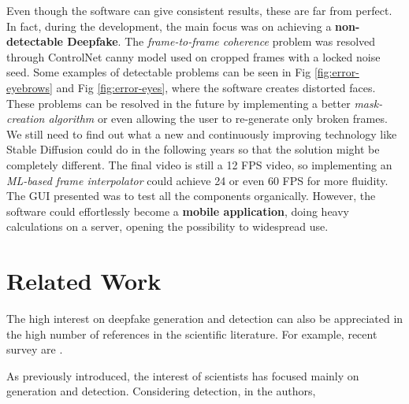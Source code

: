 \documentclass[preprint]{elsarticle}
\begin{document}
Even though the software can give consistent results, these are far from perfect. 
In fact, during the development, the main focus was on achieving a \textbf{non-detectable Deepfake}. 
The \emph{frame-to-frame coherence} problem was resolved through ControlNet 
canny model used on cropped frames with a locked noise seed. 
Some examples of detectable problems can be seen in Fig \ref{fig:error-eyebrows} and Fig \ref{fig:error-eyes}, 
where the software creates distorted faces. 
These problems can be resolved in the future by implementing a better 
\emph{mask-creation algorithm} or even allowing the user to re-generate only broken frames.
We still need to find out what a new and continuously improving technology like 
Stable Diffusion could do in the following years so that the solution might be completely different. 
The final video is still a 12 FPS video, so implementing an \emph{ML-based frame interpolator} could achieve 
24 or even 60 FPS for more fluidity. 
The GUI presented was to test all the components organically. 
However, the software could effortlessly become a \textbf{mobile application}, 
doing heavy calculations on a server, opening the possibility to widespread use.


\section{Related Work}\label{sect:related}
The high interest on deepfake generation and detection can also be appreciated in the high number of references in the scientific literature. For example, recent survey are \cite{survey1}.

As previously introduced, the interest of scientists has focused mainly on generation and detection. Considering detection, in \cite{detection1} the authors,
\end{document}
